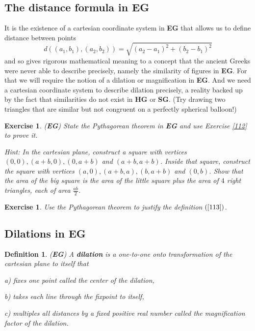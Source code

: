 \documentclass{article}%
\newtheorem{definition}[theorem]{Definition}
\newtheorem{exercise}[theorem]{Exercise}
\begin{document}
\pagebreak

\subsection{The distance formula in \textbf{EG}}

It is the existence of a cartesian coordinate system in \textbf{EG} that
allows us to define distance between points%
\begin{equation}
d\left(  \left(  a_{1},b_{1}\right)  ,\left(  a_{2},b_{2}\right)  \right)
=\sqrt{\left(  a_{2}-a_{1}\right)  ^{2}+\left(  b_{2}-b_{1}\right)  ^{2}}
\label{113}%
\end{equation}
and so gives rigorous mathematical meaning to a concept that the ancient
Greeks were never able to describe precisely, namely the similarity of figures
in \textbf{EG}. For that we will require the notion of a dilation or
magnification in \textbf{EG}. And we need a cartesian coordinate system to
describe dilation precisely, a reality backed up by the fact that similarities
do not exist in \textbf{HG} or \textbf{SG}. (Try drawing two triangles that
are similar but not congruent on a perfectly spherical balloon!)

\begin{exercise}
(\textbf{EG}) State the Pythagorean theorem in \textbf{EG} and use Exercise
\ref{112} to prove it.

Hint: In the cartesian plane, construct a square with vertices $\left(
0,0\right)  ,\left(  a+b,0\right)  ,\left(  0,a+b\right)  $ and $\left(
a+b,a+b\right)  $. Inside that square, construct the square with vertices
$\left(  a,0\right)  ,\left(  a+b,a\right)  ,\left(  b,a+b\right)  $ and
$\left(  0,b\right)  $. Show that the area of the big square is the area of
the little square plus the area of $4$ right triangles, each of area
$\frac{ab}{2}$.
\end{exercise}

\begin{exercise}
Use the Pythagorean theorem to justify the definition $\left(  \ref{113}%
\right)  $.
\end{exercise}

\pagebreak

\subsection{Dilations in \textbf{EG}}

\begin{definition}
(\textbf{EG}) A \textbf{dilation} is a one-to-one onto transformation of the
cartesian plane to itself that

a) fixes one point called the center of the dilation,

b) takes each line through the fixpoint to itself,

c) multiples all distances by a fixed positive real number called the
magnification factor of the dilation.
\end{definition}
\end{document}
